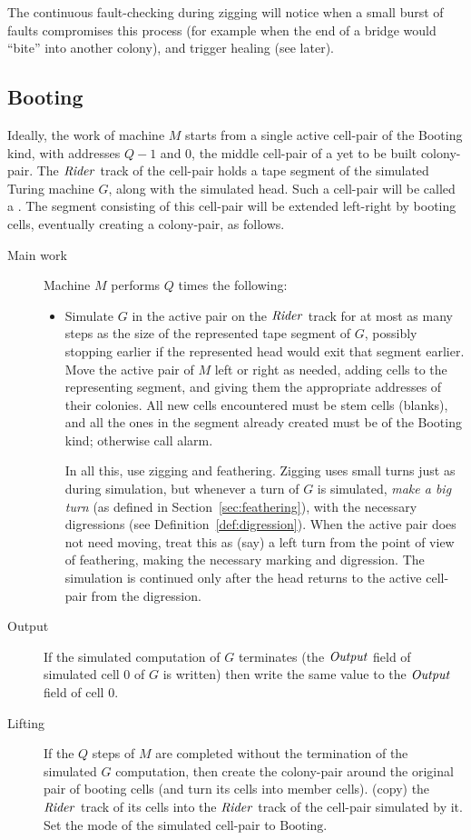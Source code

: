 \documentclass[11pt]{memoir}
\theoremstyle{definition} %
\newcommand{\fld}[1]{\ensuremath{\textit{#1\/}}}
\def\G{G} %
\newcommand{\Q}{Q} %
\newcommand{\Output}{\fld{Output}}
\newcommand{\Rider}{\fld{Rider}} %
\newcommand{\Booting}{\mathrm{Booting}}
\begin{document}
  The continuous fault-checking during zigging will notice
when a small burst of faults compromises this process (for example when the end of a bridge would
``bite'' into another colony), and trigger healing (see later).

\subsection{Booting}\label{sec:booting}

Ideally, the work of machine \( M \) starts from a single active cell-pair of the Booting kind,
with addresses \( \Q-1 \) and 0, the middle cell-pair of a yet to be built colony-pair.
The \( \Rider \) track of the cell-pair holds a tape segment of the simulated Turing machine \( \G \),
along with the simulated head.
Such a cell-pair will be called a .
The segment consisting of this cell-pair will be extended left-right by booting cells,
eventually creating a colony-pair, as follows.

\begin{description}
  \item[Main work]
Machine \( M \) performs \( \Q \) times the following:
\begin{itemize}
\item[] 
  Simulate \( \G \) in the active pair on the \( \Rider \) track
  for at most as many steps as the size of the represented
  tape segment of \( \G \), possibly stopping earlier if the represented head would exit that
  segment earlier.
  Move the active pair of \( M \) left or right as needed,
  adding cells to the representing segment, and giving them the appropriate addresses of their colonies.
  All new cells encountered must be stem cells (blanks), and all the ones in the segment already created
  must be of the Booting kind; otherwise call alarm.

  In all this, use zigging and feathering.
  Zigging uses small turns just as during simulation, but 
  whenever a turn of \( \G \) is simulated, \emph{make a big turn}
  (as defined in Section~\ref{sec:feathering}), with the necessary
  digressions (see Definition~\ref{def:digression}).
  When the active pair does not need moving, treat this as (say) a left turn from the
  point of view of feathering, making the necessary marking and digression.
  The simulation is continued only after the head returns to the active cell-pair from the digression.
  
\end{itemize}
\item[Output]
If the simulated computation of \( \G \) terminates (the \( \Output \)
field of simulated cell 0 of \( \G \) is written)
then write the same value to the \( \Output \) field of cell 0.
\item[Lifting]
  If the \( \Q \) steps of \( M \) are completed without the termination of the simulated
  \( \G \) computation, then
  create the colony-pair around the original pair of booting cells (and turn its cells into member cells).
  (copy) the \( \Rider \) track of its cells into
  the \( \Rider \) track of the cell-pair simulated by it.
  Set the mode of the simulated cell-pair to \( \Booting \).
\end{description}
\end{document}
